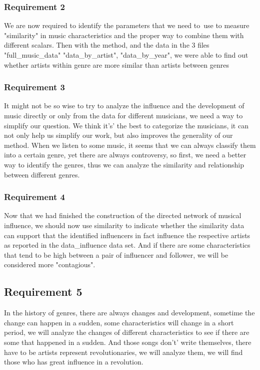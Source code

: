 \documentclass{article}
\begin{document}
\subsubsection{Requirement 2}
We are now required to identify the parameters that we need to\
use to measure "similarity" in music
characteristics and the proper way to combine them with different scalars. Then with the method,
and the data in the 3 files "full\_music\_data"
"data\_by\_artist", "data\_by\_year",
we were able to find out whether  artists
within genre  are more similar  than artists between genres\par
\subsubsection{Requirement 3}
It might not be so wise to try to analyze the influence and the development of music directly or only from the data for different musicians, we need a way to simplify our question.
We think it's' the best to categorize the musicians, it can not only help us simplify our work, but also  improves the generality of our method.
When we listen to some music, it seems that we can always classify them into a certain genre, yet there are always controversy, so first, we need a better way to identify the genres, thus we can analyze
the similarity and relationship between different genres.
\subsubsection{Requirement 4}
Now that we had finished the construction of the directed network
of musical influence, we should now use similarity to indicate whether the similarity data can support
that the identified influencers in fact influence the respective
artists as reported in the data\_influence data set. And if there are some characteristics that tend to be high between a pair of influencer and follower, we will be
considered more "contagious".
\subsection{Requirement 5}
In the history of genres, there are always changes and development, sometime the change can happen in a sudden, some characteristics will change in a short period,
we will analyze the changes
of different characteristics to see if there are some that happened in a sudden. And those songs don't' write themselves,
there have to be artists represent revolutionaries, we will analyze them, we will find those who has great influence in a revolution.
\end{document}
